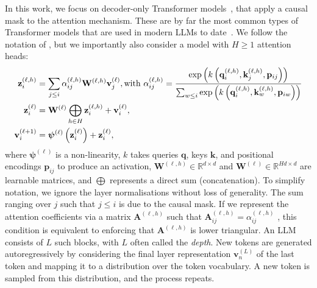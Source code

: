 \documentclass{article} %
\newcommand{\vb}{\mathbf{v}}
\newcommand{\qb}{\mathbf{q}}
\newcommand{\kb}{\mathbf{k}}
\newcommand{\pb}{\mathbf{p}}
\newcommand{\zb}{\mathbf{z}}
\newcommand{\psib}{\boldsymbol{\psi}}
\newcommand{\Wb}{\mathbf{W}}
\newcommand{\R}{\mathbb{R}}
\begin{document}
In this work, we focus on decoder-only Transformer models~\citep{radford2018improving}, that apply a causal mask to the attention mechanism. These are by far the most common types of Transformer models that are used in modern LLMs to date~\citep{team2024gemma, dubey2024llama}. We follow the notation of \cite{barbero2024transformers}, but we importantly also consider a model with $H \geq 1$ attention heads:
\begin{align*}
\label{eq:transformer}
\zb^{(\ell, h)}_i &= \sum_{j \leq i} \alpha_{ij}^{(\ell, h)} \Wb^{(\ell, h)} \vb^{(\ell)}_j, \text{with } \alpha_{ij}^{(\ell, h)} = \frac{\exp\left(k\left(\qb_i^{(\ell, h)}, \kb_j^{(\ell, h)}, \pb_{ij}\right)\right)}{\sum_{w \leq i}\exp\left(k\left(\qb_i^{(\ell, h)}, \kb_w^{(\ell, h)}, \pb_{iw}\right)\right)} \\
\zb^{(\ell)}_i &= \Wb^{(\ell)}\bigoplus_{h \in H} \zb_i^{(\ell , h)} + \vb^{(\ell)}_i,\\
\vb_i^{(\ell+1)} &= \psib^{(\ell)}\left(\zb_i^{(\ell)}\right) + \zb_i^{(\ell)},
    \vspace{-15pt}
\end{align*}
where $\psib^{(\ell)}$ is a non-linearity, $k$ takes queries $\qb$, keys $\kb$, and positional encodings $\pb_{ij}$ to produce an activation, $\Wb^{(\ell, h)} \in \R^{d \times d}$ and $\Wb^{(\ell)} \in \R^{Hd \times d}$ are learnable matrices, and $\bigoplus$ represents a direct sum (concatenation). To simplify notation, we ignore the layer normalisations without loss of generality. The sum ranging over $j$ such that $j \leq i$ is due to the causal mask. If we represent the attention coefficients via a matrix $\mathbf{A}^{(\ell,h)}$ such that $\mathbf{A}^{(\ell,h)}_{ij} = \alpha^{(\ell, h)}_{ij}$ , this condition is equivalent to enforcing that $\mathbf{A}^{(\ell,h)}$ is lower triangular. An LLM consists of $L$ such blocks, with $L$ often called the \emph{depth}. New tokens are generated autoregressively by considering the final layer representation $\vb^{(L)}_n$ of the last token and mapping it to a distribution over the token vocabulary. A new token is sampled from this distribution, and the process repeats.
\end{document}
